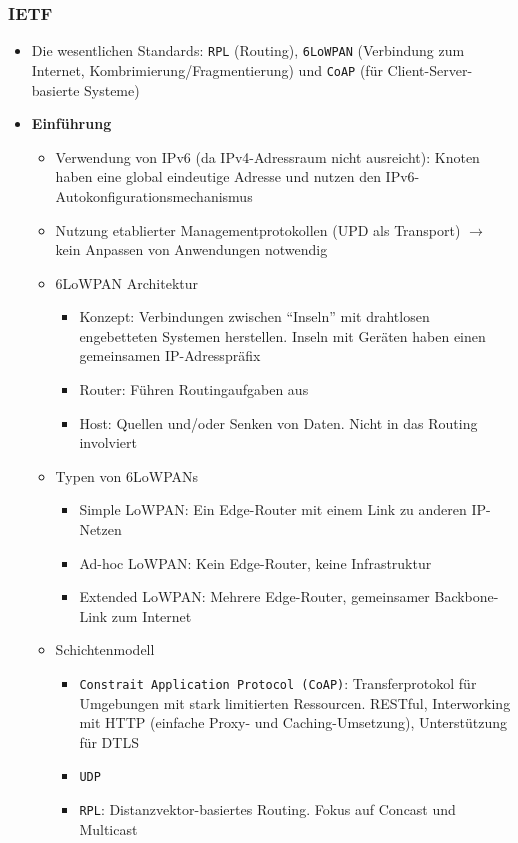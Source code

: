 \subsubsection{IETF}
\begin{itemize}
	\item Die wesentlichen Standards: \texttt{RPL} (Routing), \texttt{6LoWPAN} (Verbindung zum Internet, Kombrimierung/Fragmentierung) und \texttt{CoAP} (für Client-Server-basierte Systeme)
	\item \textbf{Einführung}
	\begin{itemize}
		\item Verwendung von IPv6 (da IPv4-Adressraum nicht ausreicht): Knoten haben eine global eindeutige Adresse und nutzen den IPv6-Autokonfigurationsmechanismus
		\item Nutzung etablierter Managementprotokollen (UPD als Transport) \(\rightarrow\) kein Anpassen von Anwendungen notwendig
		\item 6LoWPAN Architektur
		\begin{itemize}
			\item Konzept: Verbindungen zwischen "`Inseln"' mit drahtlosen engebetteten Systemen herstellen. Inseln mit Geräten haben einen gemeinsamen IP-Adresspräfix
			\item Router: Führen Routingaufgaben aus
			\item Host: Quellen und/oder Senken von Daten. Nicht in das Routing involviert
		\end{itemize}
		\item Typen von 6LoWPANs
		\begin{itemize}
			\item Simple LoWPAN: Ein Edge-Router mit einem Link zu anderen IP-Netzen
			\item Ad-hoc LoWPAN: Kein Edge-Router, keine Infrastruktur
			\item Extended LoWPAN: Mehrere Edge-Router, gemeinsamer Backbone-Link zum Internet
		\end{itemize}
		\item Schichtenmodell
		\begin{itemize}
			\item \texttt{Constrait Application Protocol (CoAP)}: Transferprotokol für Umgebungen mit stark limitierten Ressourcen. RESTful, Interworking mit HTTP (einfache Proxy- und Caching-Umsetzung), Unterstützung für DTLS
			\item \texttt{UDP}
			\item \texttt{RPL}: Distanzvektor-basiertes Routing. Fokus auf Concast und Multicast

\end{itemize}
\end{itemize}
\end{itemize}
